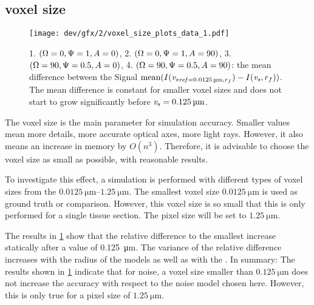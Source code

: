 \subsection{voxel size \texorpdfstring{\voxels{}}{}}
% 
% 
\begin{figure}[!tp]%
\centering
\texttt{[image: dev/gfx/2/voxel\_size\_plots\_data\_1.pdf]}
\caption[voxel size model with noise]{1. $(\textnormal{$\Omega$}=0, \textnormal{$\Psi$}=1, \textnormal{$A$}=0)$, 2. $(\textnormal{$\Omega$}=0, \textnormal{$\Psi$}=1, \textnormal{$A$}=90)$, 3. $(\textnormal{$\Omega$}=90, \textnormal{$\Psi$}=0.5, \textnormal{$A$}=0)$, 4. $(\textnormal{$\Omega$}=90, \textnormal{$\Psi$}=0.5, \textnormal{$A$}=90)$: the mean difference between the Signal $\mean(\intensity(\voxels_{\mathit{ref} = \SI{0.0125}{\micro\meter}, \fiberRadius})- \intensity(\voxels, \fiberRadius))$. The mean difference is constant for smaller voxel sizes and does not start to grow significantly before $\voxels=\SI{0.125}{\micro\meter}$. }
\label{fig:voxelsizeNoise}
\end{figure}
% 
The voxel size \voxelsize{} is the main parameter for simulation accuracy.
Smaller values mean more details, more accurate optical axes, more light rays.
However, it also means an increase in memory by $O(n^3)$.
Therefore, it is advisable to choose the voxel size as small as possible, with reasonable results.
\par
% 
To investigate this effect, a simulation is performed with different types of voxel sizes from the $\SIrange{0.0125}{1.25}{\micro\meter}$.
The smallest voxel size $\SI{0.0125}{\micro\meter}$ is used as ground truth or comparison. 
However, this voxel size is so small that this is only performed for a single tissue section. 
The pixel size \pixelsize{} will be set to $\SI{1.25}{\micro\meter}$. 
\par
%
The results  in \cref{fig:voxelsizeNoise} show that the relative difference to the smallest \voxelsize{} increase statically after a value of \SI{0.125}{\micro\meter}.
The variance of the relative difference increases with the radius of the models as well as with the \voxelsize{}.
% 
In summary:
The results shown in \cref{fig:voxelsizeNoise} indicate that for noise, a voxel size smaller than $\SI{0.125}{\micro\meter}$ does not increase the accuracy with respect to the noise model chosen here.
However, this is only true for a pixel size of $\SI{1.25}{\micro\meter}$.
% 
% 
% 
